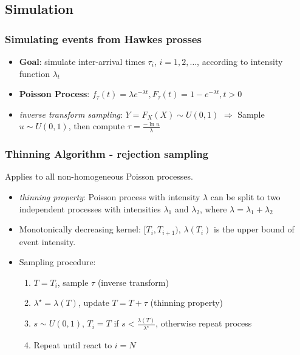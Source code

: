 \documentclass{beamer}
\begin{document}
\subsection{Simulation}

\begin{frame}
	\frametitle{Simulating events from Hawkes prosses}
	\begin{itemize}
		\item \textbf{Goal}: simulate inter-arrival times $\tau_i$, $i=1,2,\dots$, according to intensity function $\lambda_t$
		\item \textbf{Poisson Process}: $f_{\tau}(t)=\lambda e^{-\lambda t},F_{\tau}(t)=1-e^{-\lambda t} , t>0$
		\item \textit{inverse transform sampling}: $Y=F_X(X) \sim U(0,1)$ $\Rightarrow$ Sample $u\sim U(0,1)$, then compute $\tau=\frac{- \ln u}{\lambda}$
	\end{itemize}
\end{frame}

\begin{frame}
\frametitle{Thinning Algorithm - rejection sampling}
Applies to all non-homogeneous Poisson processes. 
\begin{itemize}
	\item \textit{thinning property}: Poisson process with intensity $\lambda$ can be split to two independent processes with intensities $\lambda_1$ and $\lambda_2$, where $\lambda = \lambda_1+\lambda_2$
	\item Monotonically decreasing kernel: $[T_i,T_{i+1})$, $\lambda(T_i)$ is the upper bound of event intensity.
	\item Sampling procedure:
	\begin{enumerate}
		\item $T=T_i$, sample $\tau$ (inverse transform)
		\item $\lambda^{\star}=\lambda(T)$, update $T=T+\tau$ (thinning property)
		\item $s\sim U(0,1)$, $T_i=T$ if $s<\frac{\lambda(T)}{\lambda^{\star}}$, otherwise repeat process
		\item Repeat until react to $i=N$
	\end{enumerate}
\end{itemize}
\end{frame}
\end{document}
